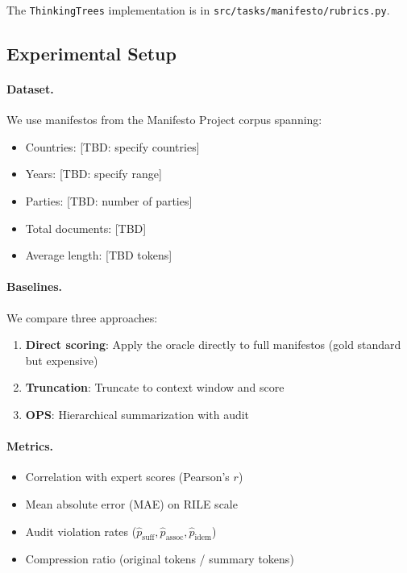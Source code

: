 The \texttt{ThinkingTrees} implementation is in \texttt{src/tasks/manifesto/rubrics.py}.

\subsection{Experimental Setup}

\paragraph{Dataset.}
We use manifestos from the Manifesto Project corpus spanning:
\begin{itemize}[nosep]
    \item Countries: [TBD: specify countries]
    \item Years: [TBD: specify range]
    \item Parties: [TBD: number of parties]
    \item Total documents: [TBD]
    \item Average length: [TBD tokens]
\end{itemize}

\paragraph{Baselines.}
We compare three approaches:
\begin{enumerate}[nosep]
    \item \textbf{Direct scoring}: Apply the oracle directly to full manifestos (gold standard but expensive)
    \item \textbf{Truncation}: Truncate to context window and score
    \item \textbf{OPS}: Hierarchical summarization with audit
\end{enumerate}

\paragraph{Metrics.}
\begin{itemize}[nosep]
    \item Correlation with expert scores (Pearson's $r$)
    \item Mean absolute error (MAE) on RILE scale
    \item Audit violation rates ($\hat{p}_{\text{suff}}, \hat{p}_{\text{assoc}}, \hat{p}_{\text{idem}}$)
    \item Compression ratio (original tokens / summary tokens)
\end{itemize}

